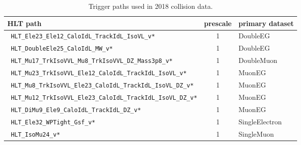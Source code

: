 \begin{table}[h]
        \scriptsize
        \centering
        \begin{tabular}{|l|c|l|}
                \hline %
                HLT path                                                       & prescale  & primary dataset \\
                \hline %
                \verb| HLT_Ele23_Ele12_CaloIdL_TrackIdL_IsoVL_v*        | & 1 & DoubleEG \\
                \verb| HLT_DoubleEle25_CaloIdL_MW_v*              | & 1 & DoubleEG \\
                \verb| HLT_Mu17_TrkIsoVVL_Mu8_TrkIsoVVL_DZ_Mass3p8_v*     | & 1 & DoubleMuon \\
                \verb| HLT_Mu23_TrkIsoVVL_Ele12_CaloIdL_TrackIdL_IsoVL_v* | & 1 & MuonEG \\
                \verb| HLT_Mu8_TrkIsoVVL_Ele23_CaloIdL_TrackIdL_IsoVL_DZ_v* | & 1 & MuonEG \\
                \verb| HLT_Mu12_TrkIsoVVL_Ele23_CaloIdL_TrackIdL_IsoVL_DZ_v*| & 1 & MuonEG \\
                \verb| HLT_DiMu9_Ele9_CaloIdL_TrackIdL_DZ_v*| & 1 & MuonEG \\
                \verb| HLT_Ele32_WPTight_Gsf_v*                        | & 1 & SingleElectron \\
                \verb| HLT_IsoMu24_v*                                     | & 1 & SingleMuon \\
                \hline %
        \end{tabular}
        \small
        \caption{Trigger paths used in 2018 collision data.  }
        \label{tab:triggerPathsC}
\end{table}

